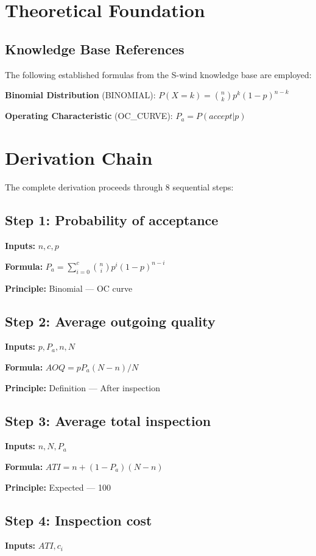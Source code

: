 \documentclass[11pt,twocolumn]{article}
\begin{document}
\section{Theoretical Foundation}

\subsection{Knowledge Base References}
The following established formulas from the S-wind knowledge base are employed:

\textbf{Binomial Distribution} (BINOMIAL): $P(X=k) = \binom{n}{k}p^k(1-p)^{n-k}$ \cite{Bernoulli}

\textbf{Operating Characteristic} (OC_CURVE): $P_a = P(accept|p)$ \cite{Dodge & Romig}


\section{Derivation Chain}

The complete derivation proceeds through 8 sequential steps:

\subsection*{Step 1: Probability of acceptance}
\textbf{Inputs:} $n, c, p$

\textbf{Formula:} $P_a = \sum_{i=0}^{c} \binom{n}{i} p^i (1-p)^{n-i}$

\textbf{Principle:} Binomial --- OC curve

\subsection*{Step 2: Average outgoing quality}
\textbf{Inputs:} $p, P_a, n, N$

\textbf{Formula:} $AOQ = p P_a (N-n)/N$

\textbf{Principle:} Definition --- After inspection

\subsection*{Step 3: Average total inspection}
\textbf{Inputs:} $n, N, P_a$

\textbf{Formula:} $ATI = n + (1-P_a)(N-n)$

\textbf{Principle:} Expected --- 100%

\subsection*{Step 4: Inspection cost}
\textbf{Inputs:} $ATI, c_i$
\end{document}
